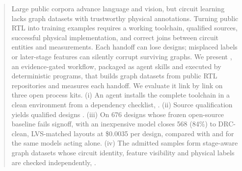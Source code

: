 \begin{abstract}
Large public corpora advance language and vision, but circuit learning lacks graph datasets with
trustworthy physical annotations. Turning public RTL into training examples requires a working
toolchain, qualified sources, successful physical implementation, and correct joins between circuit
entities and measurements. Each handoff can lose designs; misplaced labels or later-stage features can
silently corrupt surviving graphs. We present \R, an evidence-gated workflow, packaged as agent
skills and executed by deterministic programs, that builds graph datasets from public RTL
repositories and measures each handoff.
We evaluate it link by link on three open process kits. (i) An agent installs the complete toolchain
in a clean environment from a dependency checklist, .
(ii) Source qualification yields  qualified designs .
(iii) On 676 designs whose frozen open-source baseline fails signoff, \R with an inexpensive model
closes 568 (84\%) to DRC-clean, LVS-matched layouts at \$0.0035 per design, compared with
 and  for the same models acting alone.
(iv) The admitted samples form stage-aware graph datasets whose circuit identity, feature visibility
and physical labels are checked independently, .
\end{abstract}
